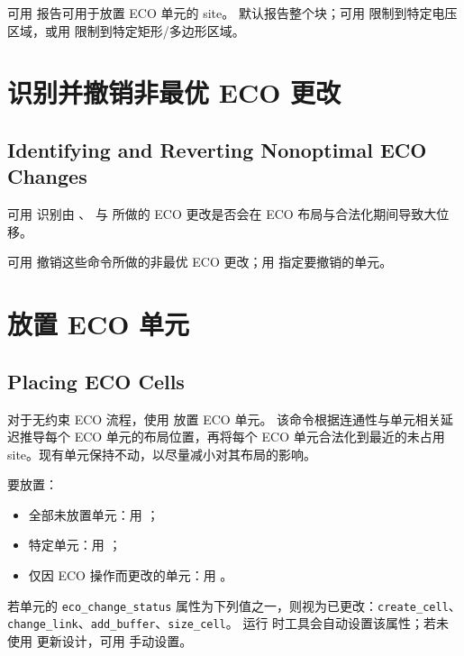 可用  报告可用于放置 ECO 单元的 site。
默认报告整个块；可用  限制到特定电压区域，或用  限制到特定矩形/多边形区域。

\section{识别并撤销非最优 ECO 更改}
\subsection*{Identifying and Reverting Nonoptimal ECO Changes}

可用  识别由 、 与  所做的 ECO 更改是否会在 ECO 布局与合法化期间导致大位移。

可用  撤销这些命令所做的非最优 ECO 更改；用  指定要撤销的单元。

\section{放置 ECO 单元}
\subsection*{Placing ECO Cells}

对于无约束 ECO 流程，使用  放置 ECO 单元。
该命令根据连通性与单元相关延迟推导每个 ECO 单元的布局位置，再将每个 ECO 单元合法化到最近的未占用 site。现有单元保持不动，以尽量减小对其布局的影响。

要放置：
\begin{itemize}
  \item 全部未放置单元：用 ；
  \item 特定单元：用 ；
  \item 仅因 ECO 操作而更改的单元：用 。
\end{itemize}

若单元的 \texttt{eco\_change\_status} 属性为下列值之一，则视为已更改：\texttt{create\_cell}、\texttt{change\_link}、\texttt{add\_buffer}、\texttt{size\_cell}。
运行  时工具会自动设置该属性；若未使用  更新设计，可用  手动设置。

